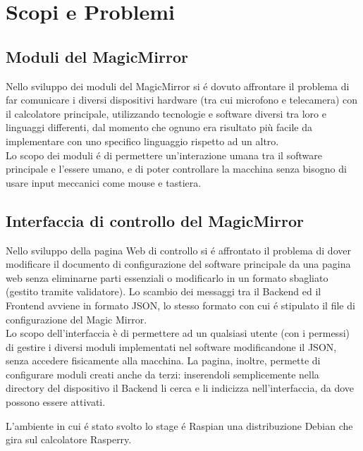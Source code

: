 \chapter{Scopi e Problemi}

\section{Moduli del MagicMirror}
Nello sviluppo dei moduli del MagicMirror si \'e dovuto affrontare il problema di far comunicare
i diversi dispositivi hardware (tra cui microfono e telecamera) con il calcolatore principale, utilizzando tecnologie
e software diversi tra loro e linguaggi differenti, dal momento che ognuno era risultato
più facile da implementare con uno specifico linguaggio rispetto ad un altro.\\
Lo scopo dei moduli \'e di permettere un'interazione umana tra il software principale
e l'essere umano, e di poter controllare la macchina senza bisogno di usare input meccanici come mouse e tastiera.
\\[2\baselineskip]
\section{Interfaccia di controllo del MagicMirror}
Nello sviluppo della pagina Web di controllo si \'e affrontato il problema di dover modificare
il documento di configurazione del software principale da una pagina web senza eliminarne parti essenziali
o modificarlo in un formato sbagliato (gestito tramite validatore).
Lo scambio dei messaggi tra il Backend ed il Frontend avviene in formato JSON, lo stesso formato
con cui \'e stipulato il file di configurazione del Magic Mirror.\\
Lo scopo dell'interfaccia è di permettere ad un qualsiasi utente (con i permessi) di gestire
i diversi moduli implementati nel software modificandone il JSON, senza accedere fisicamente alla macchina.
La pagina, inoltre, permette di configurare moduli creati anche da terzi: inserendoli
semplicemente nella directory del dispositivo il Backend li cerca e li indicizza nell'interfaccia,
da dove possono essere attivati.

L'ambiente in cui \'e stato svolto lo stage \'e Raspian una distribuzione Debian che gira
sul calcolatore Rasperry.
